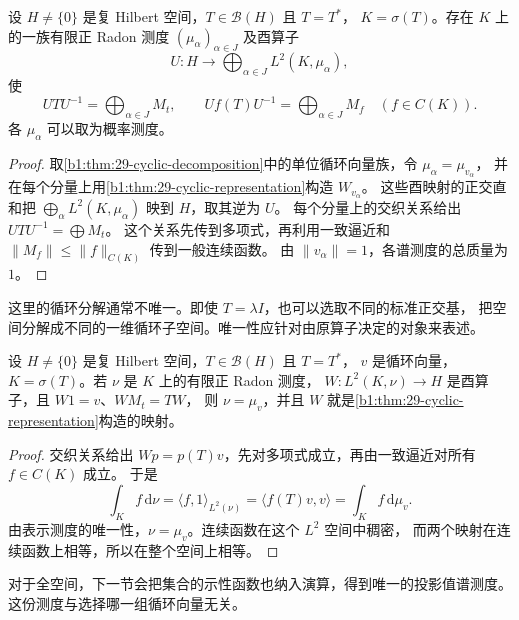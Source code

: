 \begin{theorem}[有界自伴算子的乘法表示]
\label{b1:thm:29-bounded-spectral-representation}
设 \(H\ne\{0\}\) 是复 Hilbert 空间，\(T\in\mathcal B(H)\) 且 \(T=T^*\)，
\(K=\sigma(T)\)。存在 \(K\) 上的一族有限正 Radon 测度 \((\mu_\alpha)_{\alpha\in J}\)
及酉算子
\[
 U:H\longrightarrow\bigoplus_{\alpha\in J}L^2(K,\mu_\alpha),
\]
使
\[
 UTU^{-1}=\bigoplus_{\alpha\in J}M_t,\qquad
 Uf(T)U^{-1}=\bigoplus_{\alpha\in J}M_f\quad(f\in C(K)).
\]
各 \(\mu_\alpha\) 可以取为概率测度。
\end{theorem}
\begin{proof}
取\cref{b1:thm:29-cyclic-decomposition}中的单位循环向量族，令 \(\mu_\alpha=\mu_{v_\alpha}\)，
并在每个分量上用\cref{b1:thm:29-cyclic-representation}构造 \(W_{v_\alpha}\)。
这些酉映射的正交直和把 \(\bigoplus_\alpha L^2(K,\mu_\alpha)\) 映到 \(H\)，取其逆为 \(U\)。
每个分量上的交织关系给出 \(UTU^{-1}=\bigoplus M_t\)。
这个关系先传到多项式，再利用一致逼近和
\(\|M_f\|\leq\|f\|_{C(K)}\) 传到一般连续函数。
由 \(\|v_\alpha\|=1\)，各谱测度的总质量为 \(1\)。
\end{proof}

这里的循环分解通常不唯一。即使 \(T=\lambda I\)，也可以选取不同的标准正交基，
把空间分解成不同的一维循环子空间。唯一性应针对由原算子决定的对象来表述。

\begin{proposition}[循环表示的唯一性]
\label{b1:prop:29-cyclic-uniqueness}
设 \(H\ne\{0\}\) 是复 Hilbert 空间，\(T\in\mathcal B(H)\) 且 \(T=T^*\)，
\(v\) 是循环向量，\(K=\sigma(T)\)。若 \(\nu\) 是 \(K\) 上的有限正 Radon 测度，
\(W:L^2(K,\nu)\to H\) 是酉算子，且 \(W1=v\)、\(WM_t=TW\)，
则 \(\nu=\mu_v\)，并且 \(W\) 就是\cref{b1:thm:29-cyclic-representation}构造的映射。
\end{proposition}
\begin{proof}
交织关系给出 \(W p=p(T)v\)，先对多项式成立，再由一致逼近对所有 \(f\in C(K)\) 成立。
于是
\[
 \int_K f\,\mathrm{d}\nu
 =\langle f,1\rangle_{L^2(\nu)}
 =\langle f(T)v,v\rangle
 =\int_K f\,\mathrm{d}\mu_v.
\]
由表示测度的唯一性，\(\nu=\mu_v\)。连续函数在这个 \(L^2\) 空间中稠密，
而两个映射在连续函数上相等，所以在整个空间上相等。
\end{proof}

对于全空间，下一节会把集合的示性函数也纳入演算，得到唯一的投影值谱测度。
这份测度与选择哪一组循环向量无关。
